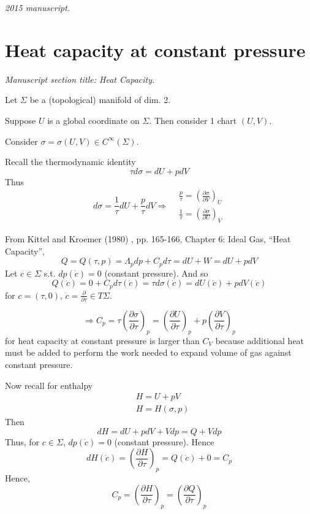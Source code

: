 \noindent\textit{2015 manuscript.}

\section{Heat capacity at constant pressure}
\noindent\textit{Manuscript section title: Heat Capacity.}

Let $\Sigma$ be a (topological) manifold of dim. 2.  

Suppose $U$ is a global coordinate on $\Sigma$.  Then consider 1 chart $(U,V)$.  

Consider $\sigma = \sigma(U,V) \in C^{\infty}(\Sigma)$.  

Recall the thermodynamic identity 
\[
\tau d\sigma = dU + pdV
\]
Thus
\[
d\sigma = \frac{1}{\tau} dU + \frac{p}{\tau} dV \Longrightarrow \begin{aligned} & \frac{p}{\tau} = \left( \frac{ \partial \sigma}{ \partial V} \right)_U \\
  & \frac{1}{\tau}  =\left( \frac{ \partial \sigma}{ \partial U} \right)_V \end{aligned}
\]



From Kittel and Kroemer (1980) \cite{CKittelHKroemer1980}, pp. 165-166, Chapter 6: Ideal Gas, ``Heat Capacity'',
\[
Q = Q(\tau,p) = \Lambda_p dp + C_p d\tau = dU + W = dU + p dV 
\]
Let $c\in \Sigma$ s.t. $dp(\dot{c})=0$ (constant pressure).  And so 
\[
Q(\dot{c}) = 0 + C_p d\tau(\dot{c}) = \tau d\sigma (\dot{c}) = dU(\dot{c}) + pdV(\dot{c})
\]
for $c=(\tau,0)$, $\dot{c} = \frac{\partial }{ \partial \tau} \in T\Sigma$.  

\[
\Longrightarrow C_p = \tau \left( \frac{ \partial \sigma }{ \partial \tau} \right)_p = \left( \frac{ \partial U}{ \partial \tau} \right)_p + p \left( \frac{ \partial V}{ \partial \tau} \right)_p
\]
for heat capacity at constant pressure is larger than $C_V$ because additional heat must be added to perform the work needed to expand volume of gas against constant pressure.  

Now recall for enthalpy 
\[
\begin{aligned}
  & H = U+ pV \\ 
  & H = H(\sigma, p)
\end{aligned}
\]
Then
\[
dH = dU+ pdV + Vdp = Q + Vdp 
\]
Thus, for $c\in \Sigma$, $dp(\dot{c})=0$ (constant pressure).  Hence
\[
dH(\dot{c}) = \left( \frac{ \partial H}{ \partial \tau} \right)_p = Q(\dot{c})  +  0 = C_p
\]
Hence, 
\[
C_p = \left( \frac{ \partial H}{ \partial \tau } \right)_p = \left( \frac{ \partial Q}{ \partial \tau} \right)_p
\]


